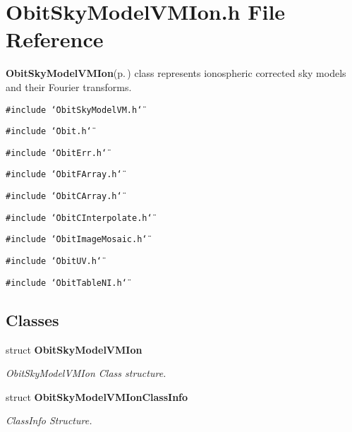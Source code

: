 \section{Obit\-Sky\-Model\-VMIon.h File Reference}
\label{ObitSkyModelVMIon_8h}
{\bf Obit\-Sky\-Model\-VMIon}{\rm (p.\,\pageref{structObitSkyModelVMIon})} class represents ionospheric corrected sky models and their Fourier transforms. 

{\tt \#include \char`\"{}Obit\-Sky\-Model\-VM.h\char`\"{}}\par
{\tt \#include \char`\"{}Obit.h\char`\"{}}\par
{\tt \#include \char`\"{}Obit\-Err.h\char`\"{}}\par
{\tt \#include \char`\"{}Obit\-FArray.h\char`\"{}}\par
{\tt \#include \char`\"{}Obit\-CArray.h\char`\"{}}\par
{\tt \#include \char`\"{}Obit\-CInterpolate.h\char`\"{}}\par
{\tt \#include \char`\"{}Obit\-Image\-Mosaic.h\char`\"{}}\par
{\tt \#include \char`\"{}Obit\-UV.h\char`\"{}}\par
{\tt \#include \char`\"{}Obit\-Table\-NI.h\char`\"{}}\par
\subsection*{Classes}
\begin{CompactItemize}
\item 
struct {\bf Obit\-Sky\-Model\-VMIon}
\begin{CompactList}\small\item\em Obit\-Sky\-Model\-VMIon Class structure. \item\end{CompactList}\item 
struct {\bf Obit\-Sky\-Model\-VMIon\-Class\-Info}
\begin{CompactList}\small\item\em Class\-Info Structure. \item\end{CompactList}\end{CompactItemize}
